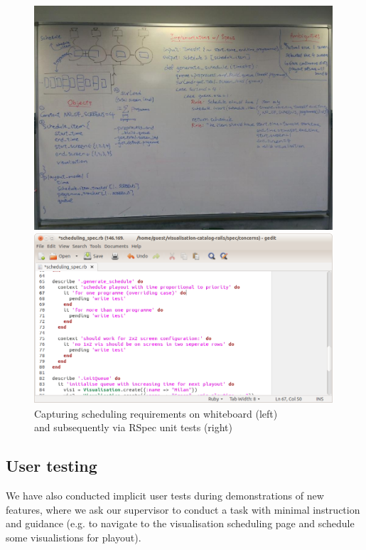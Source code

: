 \documentclass[a4paper]{article}
\begin{document}
\begin{figure}[H]
  \begin{minipage}{0.46\textwidth}
      \includegraphics[width = 0.99\textwidth, trim = 0 1cm 0 1.5cm, clip]{./evaluation/scheduling_whiteboard.jpg}
  \end{minipage}
  \begin{minipage}{0.53\textwidth}
      \includegraphics[width = 0.99\textwidth]{./evaluation/scheduling_spec.png}
  \end{minipage}
  \caption{Capturing scheduling requirements on whiteboard (left)\\ and subsequently via RSpec unit tests (right)}
 
\end{figure}

\subsection{User testing}
We have also conducted implicit user tests during demonstrations of new features,
where we ask our supervisor to conduct a task with minimal instruction and guidance
(e.g. to navigate to the visualisation scheduling page and schedule some visualistions
for playout).
\end{document}
